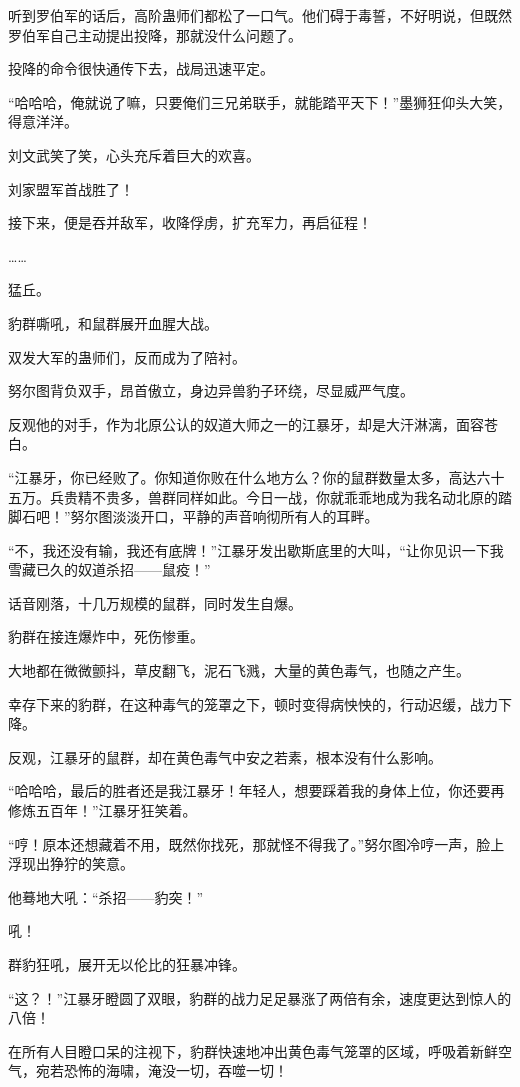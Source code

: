 \begin{this_body}
听到罗伯军的话后，高阶蛊师们都松了一口气。他们碍于毒誓，不好明说，但既然罗伯军自己主动提出投降，那就没什么问题了。

投降的命令很快通传下去，战局迅速平定。

“哈哈哈，俺就说了嘛，只要俺们三兄弟联手，就能踏平天下！”墨狮狂仰头大笑，得意洋洋。

刘文武笑了笑，心头充斥着巨大的欢喜。

刘家盟军首战胜了！

接下来，便是吞并敌军，收降俘虏，扩充军力，再启征程！

……

猛丘。

豹群嘶吼，和鼠群展开血腥大战。

双发大军的蛊师们，反而成为了陪衬。

努尔图背负双手，昂首傲立，身边异兽豹子环绕，尽显威严气度。

反观他的对手，作为北原公认的奴道大师之一的江暴牙，却是大汗淋漓，面容苍白。

“江暴牙，你已经败了。你知道你败在什么地方么？你的鼠群数量太多，高达六十五万。兵贵精不贵多，兽群同样如此。今日一战，你就乖乖地成为我名动北原的踏脚石吧！”努尔图淡淡开口，平静的声音响彻所有人的耳畔。

“不，我还没有输，我还有底牌！”江暴牙发出歇斯底里的大叫，“让你见识一下我雪藏已久的奴道杀招——鼠疫！”

话音刚落，十几万规模的鼠群，同时发生自爆。

豹群在接连爆炸中，死伤惨重。

大地都在微微颤抖，草皮翻飞，泥石飞溅，大量的黄色毒气，也随之产生。

幸存下来的豹群，在这种毒气的笼罩之下，顿时变得病怏怏的，行动迟缓，战力下降。

反观，江暴牙的鼠群，却在黄色毒气中安之若素，根本没有什么影响。

“哈哈哈，最后的胜者还是我江暴牙！年轻人，想要踩着我的身体上位，你还要再修炼五百年！”江暴牙狂笑着。

“哼！原本还想藏着不用，既然你找死，那就怪不得我了。”努尔图冷哼一声，脸上浮现出狰狞的笑意。

他蓦地大吼：“杀招——豹突！”

吼！

群豹狂吼，展开无以伦比的狂暴冲锋。

“这？！”江暴牙瞪圆了双眼，豹群的战力足足暴涨了两倍有余，速度更达到惊人的八倍！

在所有人目瞪口呆的注视下，豹群快速地冲出黄色毒气笼罩的区域，呼吸着新鲜空气，宛若恐怖的海啸，淹没一切，吞噬一切！


\end{this_body}

